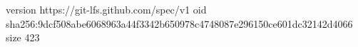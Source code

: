 version https://git-lfs.github.com/spec/v1
oid sha256:9dcf508abe6068963a44f3342b650978c4748087e296150ce601dc32142d4066
size 423
